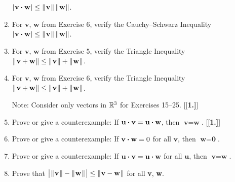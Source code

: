 \begin{enumerate}[\bfseries 1.]
  $\lvert\mspace{1mu}\textbf{v} \bm{\cdot} \textbf{w}\mspace{1mu}\rvert \le \lVert\mspace{1mu}\textbf{v}\mspace{1mu}\rVert\,\lVert\mspace{1mu}\textbf{w}\mspace{1mu}\rVert$.
 \item For $\textbf{v}$, $\textbf{w}$ from Exercise 6, verify the Cauchy--Schwarz Inequality
  $\lvert\mspace{1mu}\textbf{v} \bm{\cdot} \textbf{w}\mspace{1mu}\rvert \le \lVert\mspace{1mu}\textbf{v}\mspace{1mu}\rVert\,\lVert\mspace{1mu}\textbf{w}\mspace{1mu}\rVert$.
 \item For $\textbf{v}$, $\textbf{w}$ from Exercise 5, verify the Triangle Inequality
  $\lVert\mspace{1mu}\textbf{v} + \textbf{w}\mspace{1mu}\rVert \le \lVert\mspace{1mu}\textbf{v}\mspace{1mu}\rVert + \lVert\mspace{1mu}\textbf{w}\mspace{1mu}\rVert$.
 \item For $\textbf{v}$, $\textbf{w}$ from Exercise 6, verify the Triangle Inequality
  $\lVert\mspace{1mu}\textbf{v} + \textbf{w}\mspace{1mu}\rVert \le \lVert\mspace{1mu}\textbf{v}\mspace{1mu}\rVert + \lVert\mspace{1mu}\textbf{w}\mspace{1mu}\rVert$.
\vspace{1mm}
\par\noindent Note: Consider only vectors in $\mathbb{R}^{3}$ for Exercises 15--25.\vspace{1mm}
[{[\bfseries 1.]}]
 \item Prove or give a counterexample: If $\textbf{u} \bm{\cdot} \textbf{v} = \textbf{u} \bm{\cdot} \textbf{w}$,
  then $\textbf{v} =\textbf{w}$.
[{[\bfseries 1.]}]
 \item Prove or give a counterexample: If $\textbf{v} \bm{\cdot} \textbf{w} = 0$ for all $\textbf{v}$, then
  $\textbf{w} =\textbf{0}$.
 \item Prove or give a counterexample: If $\textbf{u} \bm{\cdot} \textbf{v} = \textbf{u} \bm{\cdot} \textbf{w}$
  for all $\textbf{u}$, then $\textbf{v} =\textbf{w}$.
 \item Prove that $\bigl\lvert\mspace{1mu}\lVert\mspace{1mu}\textbf{v}\mspace{1mu}\rVert - \lVert\mspace{1mu}\textbf{w}\mspace{1mu}\rVert\mspace{1mu}\bigr\rvert \le \lVert\mspace{1mu}\textbf{v} - \textbf{w}\mspace{1mu}\rVert$ for all
  \textbf{v}, \textbf{w}.


\end{enumerate}
